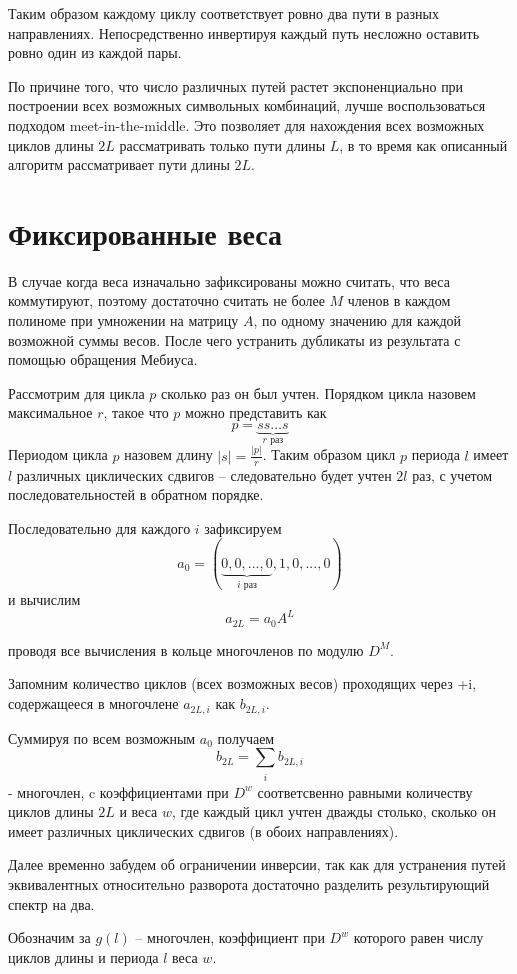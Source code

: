 Таким образом каждому циклу соответствует ровно два пути в разных направлениях. Непосредственно
инвертируя каждый путь несложно оставить ровно один из каждой пары.

По причине того, что число различных путей растет
экспоненциально при построении всех возможных символьных комбинаций, лучше воспользоваться подходом
meet-in-the-middle. Это позволяет для нахождения всех возможных циклов длины $2L$ рассматривать
только пути длины $L$, в то время как описанный алгоритм рассматривает пути длины $2L$.

\section{Фиксированные веса}
В случае когда веса изначально зафиксированы можно считать, что веса коммутируют, поэтому достаточно
считать не более $M$ членов в каждом полиноме при умножении на матрицу $A$,
 по одному значению для каждой возможной суммы весов. После чего устранить дубликаты из результата с 
помощью обращения Мебиуса.

Рассмотрим для цикла $p$ сколько раз он был учтен. Порядком цикла назовем максимальное $r$, такое что
$p$ можно представить как 
\[
p=\underbrace{ss \ldots s}_{r \text{ раз}}
\]
Периодом цикла $p$ назовем длину $|s|=\frac{|p|}{r}$. Таким образом цикл $p$ 
периода $l$ имеет $l$ различных циклических сдвигов -- следовательно будет учтен $2l$ раз, с учетом
последовательностей в обратном порядке.

Последовательно для каждого $i$ зафиксируем
\[
a_0=(\underbrace{0,0,...,0}_{i \text{ раз}},1,0,...,0)
\]
и вычислим
\[
a_{2L}=a_0A^L
\]

проводя все вычисления в кольце многочленов по модулю $D^M$.

Запомним количество циклов (всех возможных весов) проходящих через +i, содержащееся в 
многочлене $a_{2L,i}$ как $b_{2L,i}$.

Суммируя по всем возможным $a_0$ получаем 
\[
b_{2L}=\sum_{\substack{i}}b_{2L,i}
\]
 - многочлен, c коэффициентами при $D^w$ соответсвенно равными количеству циклов длины $2L$ и веса $w$,
 где каждый цикл учтен дважды столько, сколько он имеет различных циклических
 сдвигов (в обоих направлениях).  

Далее временно забудем об ограничении инверсии, так как для устранения путей эквивалентных
относительно разворота достаточно разделить результирующий спектр на два.

Обозначим за $g(l)$ -- многочлен, коэффициент при $D^w$ которого равен числу циклов длины и периода $l$ веса $w$.

